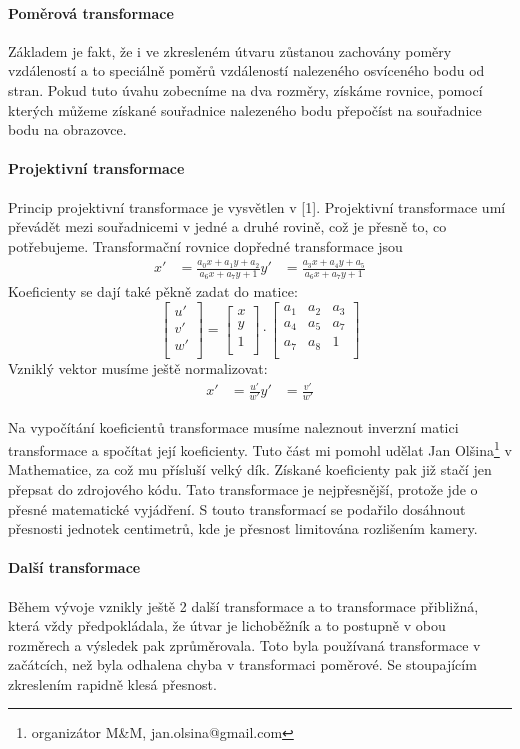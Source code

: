\documentclass[twoside,12pt]{article}
\newcommand{\podpodsekce}[1]{\paragraph{#1}\quad\vskip 6pt}
\begin{document}
\podpodsekce{ Poměrová transformace}

Základem je fakt, že i ve zkresleném útvaru zůstanou zachovány poměry vzdáleností a to speciálně poměrů vzdáleností nalezeného osvíceného bodu od stran. Pokud tuto úvahu zobecníme na dva rozměry, získáme rovnice, pomocí kterých můžeme získané souřadnice nalezeného bodu přepočíst na souřadnice bodu na obrazovce.

\podpodsekce{ Projektivní transformace}
Princip projektivní transformace je vysvětlen v [1]. Projektivní transformace umí převádět mezi souřadnicemi v jedné a druhé rovině, což je přesně to, co potřebujeme. Transformační rovnice dopředné transformace jsou 
\begin{align*}
 x' &= \frac{a_0x+a_1y+a_2}{a_6x+a_7y+1}
 y' &= \frac{a_3x+a_4y+a_5}{a_6x+a_7y+1}
\end{align*}
Koeficienty se dají také pěkně zadat do matice:
$$\left[
 \begin{array}{c} 
  u'\\
  v'\\
  w'\\
 \end{array}
\right]
=
\left[
 \begin{array}{c}
 x\\
 y\\
 1\\
 \end{array}
\right]
\cdot
\left[
 \begin{array}{ccc}
 a_1 & a_2 & a_3\\
 a_4 & a_5 & a_7\\
 a_7 & a_8 & 1\\
 \end{array}
\right]
  $$
Vzniklý vektor musíme ještě normalizovat:
\begin{align*}
 x' &= \frac{u'}{w'}
 y' &= \frac{v'}{w'}
\end{align*}

Na vypočítání koeficientů transformace musíme naleznout inverzní matici transformace a spočítat její koeficienty. Tuto část mi pomohl udělat Jan Olšina\footnote{organizátor M\&M, jan.olsina@gmail.com} v Mathematice, za což mu přísluší velký dík. Získané koeficienty pak již stačí jen přepsat do zdrojového kódu. Tato transformace je nejpřesnější, protože jde o přesné matematické vyjádření. S touto transformací se podařilo dosáhnout přesnosti jednotek centimetrů, kde je přesnost limitována rozlišením kamery.

\podpodsekce{ Další transformace}
Během vývoje vznikly ještě 2 další transformace a to transformace přibližná, která vždy předpokládala, že útvar je lichoběžník a to postupně v obou rozměrech a výsledek pak zprůměrovala. Toto byla používaná transformace v začátcích, než byla odhalena chyba v transformaci poměrové. Se stoupajícím zkreslením rapidně klesá přesnost. 
\end{document}

